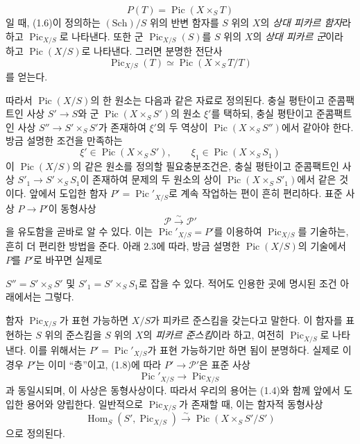 \[
P(T)=\operatorname{Pic}(X\times_ST)
\]
일 때, (1.6)이 정의하는 $(\mathrm{Sch})/S$ 위의 반변 함자를 $S$ 위의
$X$의 \emph{상대 피카르 함자}라 하고 $\operatorname{Pic}_{X/S}$로
나타낸다. 또한 군 $\operatorname{Pic}_{X/S}(S)$를 $S$ 위의 $X$의
\emph{상대 피카르 군}이라 하고 $\operatorname{Pic}(X/S)$로 나타낸다.
그러면 분명한 전단사
\begin{equation}
\operatorname{Pic}_{X/S}(T)\simeq\operatorname{Pic}(X\times_ST/T)
\tag{1.7}
\end{equation}
를 얻는다.

따라서 $\operatorname{Pic}(X/S)$의 한 원소는 다음과 같은 자료로
정의된다. 충실 평탄이고 준콤팩트인 사상 $S'\longrightarrow S$와 군
$\operatorname{Pic}(X\times_SS')$의 원소 $\xi'$를 택하되, 충실 평탄이고
준콤팩트인 사상 $S''\longrightarrow S'\times_SS'$가 존재하여 $\xi'$의
두 역상이 $\operatorname{Pic}(X\times_SS'')$에서 같아야 한다. 방금
설명한 조건을 만족하는
\[
\xi'\in\operatorname{Pic}(X\times_SS'),\qquad
\xi_1\in\operatorname{Pic}(X\times_SS_1)
\]
이 $\operatorname{Pic}(X/S)$의 같은 원소를 정의할 필요충분조건은,
충실 평탄이고 준콤팩트인 사상
$S'_1\longrightarrow S'\times_SS_1$이 존재하여 문제의 두 원소의 상이
$\operatorname{Pic}(X\times_SS'_1)$에서 같은 것이다. 앞에서 도입한 함자
$P'=\operatorname{Pic}'_{X/S}$로 계속 작업하는 편이 흔히 편리하다.
표준 사상 $P\longrightarrow P'$이 동형사상
\begin{equation}
\mathcal P\xrightarrow{\sim}\mathcal P'
\tag{1.8}
\end{equation}
을 유도함을 곧바로 알 수 있다. 이는
$\operatorname{Pic}'_{X/S}=P'$를 이용하여
$\operatorname{Pic}_{X/S}$를 기술하는, 흔히 더 편리한 방법을 준다. 아래
2.3에 따라, 방금 설명한 $\operatorname{Pic}(X/S)$의 기술에서 $P$를
$P'$로 바꾸면 실제로

$S''=S'\times_SS'$ 및 $S'_1=S'\times_SS_1$로 잡을 수 있다. 적어도 인용한
곳에 명시된 조건 아래에서는 그렇다.

함자 $\operatorname{Pic}_{X/S}$가 표현 가능하면 $X/S$가 피카르 준스킴을
갖는다고 말한다. 이 함자를 표현하는 $S$ 위의 준스킴을 $S$ 위의 $X$의
\emph{피카르 준스킴}이라 하고, 여전히 $\operatorname{Pic}_{X/S}$로
나타낸다. 이를 위해서는 $P'=\operatorname{Pic}'_{X/S}$가 표현
가능하기만 하면 됨이 분명하다. 실제로 이 경우 $P'$는 이미 “층”이고,
(1.8)에 따라 $P'\longrightarrow\mathcal P'$은 표준 사상
\begin{equation}
\operatorname{Pic}'_{X/S}\longrightarrow\operatorname{Pic}_{X/S}
\tag{1.9}
\end{equation}
과 동일시되며, 이 사상은 동형사상이다. 따라서 우리의 용어는 (1.4)와
함께 앞에서 도입한 용어와 양립한다. 일반적으로
$\operatorname{Pic}_{X/S}$가 존재할 때, 이는 함자적 동형사상
\begin{equation}
\operatorname{Hom}_S(S',\operatorname{Pic}_{X/S})\xrightarrow{\sim}
\operatorname{Pic}(X\times_SS'/S')
\tag{1.10}
\end{equation}
으로 정의된다.

